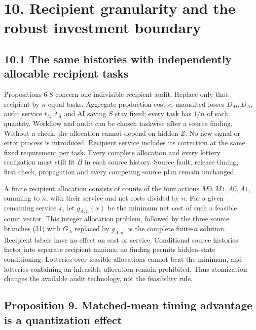 \documentclass[
  11pt,
  a4paper,
]{article}
\begin{document}
\hypertarget{recipient-granularity-and-the-robust-investment-boundary}{%
\section{10. Recipient granularity and the robust investment
boundary}\label{recipient-granularity-and-the-robust-investment-boundary}}

\hypertarget{the-same-histories-with-independently-allocable-recipient-tasks}{%
\subsection{10.1 The same histories with independently allocable
recipient
tasks}\label{the-same-histories-with-independently-allocable-recipient-tasks}}

Propositions 6-8 concern one indivisible recipient audit. Replace only
that recipient by \(n\) equal tasks. Aggregate production cost \(c\),
unaudited losses \(D_M,D_A\), audit service \(t_M,t_A\) and AI saving
\(S\) stay fixed; every task has \(1/n\) of each quantity. Workflow and
audit can be chosen taskwise after a source finding. Without a check,
the allocation cannot depend on hidden \(Z\). No new signal or error
process is introduced. Recipient service includes its correction at the
same fixed requirement per task. Every complete allocation and every
lottery realization must still fit \(B\) in each source history. Source
fault, release timing, first check, propagation and every competing
source plan remain unchanged.

A finite recipient allocation consists of counts of the four actions
\(M0,M1,A0,A1\), summing to \(n\), with their service and net costs
divided by \(n\). For a given remaining service \(x\), let
\(g_{A,n}(x)\) be the minimum net cost of such a feasible count vector.
This integer allocation problem, followed by the three source branches
(31) with \(G_A\) replaced by \(g_{A,n}\), is the complete finite-\(n\)
solution. Recipient labels have no effect on cost or service.
Conditional source histories factor into separate recipient minima; no
finding permits hidden-state conditioning. Lotteries over feasible
allocations cannot beat the minimum, and lotteries containing an
infeasible allocation remain prohibited. Thus atomization changes the
available audit technology, not the feasibility rule.

\hypertarget{proposition-9.-matched-mean-timing-advantage-is-a-quantization-effect}{%
\subsection{Proposition 9. Matched-mean timing advantage is a
quantization
effect}\label{proposition-9.-matched-mean-timing-advantage-is-a-quantization-effect}}
\end{document}
